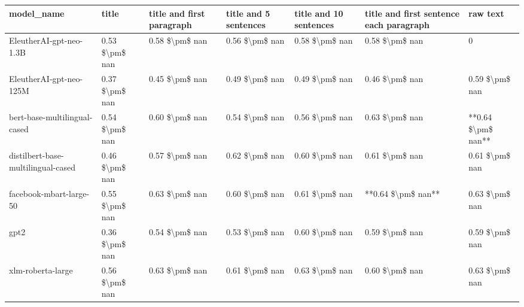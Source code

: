\begin{tabular}{lllllll}
\toprule
                        model\_name &          title & title and first paragraph & title and 5 sentences & title and 10 sentences & title and first sentence each paragraph &           raw text \\
\midrule
           EleutherAI-gpt-neo-1.3B & 0.53 \$\textbackslash pm\$ nan &            0.58 \$\textbackslash pm\$ nan &        0.56 \$\textbackslash pm\$ nan &         0.58 \$\textbackslash pm\$ nan &                          0.58 \$\textbackslash pm\$ nan &                  0 \\
           EleutherAI-gpt-neo-125M & 0.37 \$\textbackslash pm\$ nan &            0.45 \$\textbackslash pm\$ nan &        0.49 \$\textbackslash pm\$ nan &         0.49 \$\textbackslash pm\$ nan &                          0.46 \$\textbackslash pm\$ nan &     0.59 \$\textbackslash pm\$ nan \\
      bert-base-multilingual-cased & 0.54 \$\textbackslash pm\$ nan &            0.60 \$\textbackslash pm\$ nan &        0.54 \$\textbackslash pm\$ nan &         0.56 \$\textbackslash pm\$ nan &                          0.63 \$\textbackslash pm\$ nan & **0.64 \$\textbackslash pm\$ nan** \\
distilbert-base-multilingual-cased & 0.46 \$\textbackslash pm\$ nan &            0.57 \$\textbackslash pm\$ nan &        0.62 \$\textbackslash pm\$ nan &         0.60 \$\textbackslash pm\$ nan &                          0.61 \$\textbackslash pm\$ nan &     0.61 \$\textbackslash pm\$ nan \\
           facebook-mbart-large-50 & 0.55 \$\textbackslash pm\$ nan &            0.63 \$\textbackslash pm\$ nan &        0.60 \$\textbackslash pm\$ nan &         0.61 \$\textbackslash pm\$ nan &                      **0.64 \$\textbackslash pm\$ nan** &     0.63 \$\textbackslash pm\$ nan \\
                              gpt2 & 0.36 \$\textbackslash pm\$ nan &            0.54 \$\textbackslash pm\$ nan &        0.53 \$\textbackslash pm\$ nan &         0.60 \$\textbackslash pm\$ nan &                          0.59 \$\textbackslash pm\$ nan &     0.59 \$\textbackslash pm\$ nan \\
                 xlm-roberta-large & 0.56 \$\textbackslash pm\$ nan &            0.63 \$\textbackslash pm\$ nan &        0.61 \$\textbackslash pm\$ nan &         0.63 \$\textbackslash pm\$ nan &                          0.60 \$\textbackslash pm\$ nan &     0.63 \$\textbackslash pm\$ nan \\
\bottomrule
\end{tabular}
